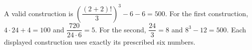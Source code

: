 A valid construction is $\boxed{\left(\dfrac{(2+2)!}{3}\right)^3-6-6=500}$. For the first construction, $4\cdot24+4=100$ and $\dfrac{720}{24\cdot6}=5$. For the second, $\dfrac{24}{3}=8$ and $8^3-12=500$. Each displayed construction uses exactly its prescribed six numbers.
